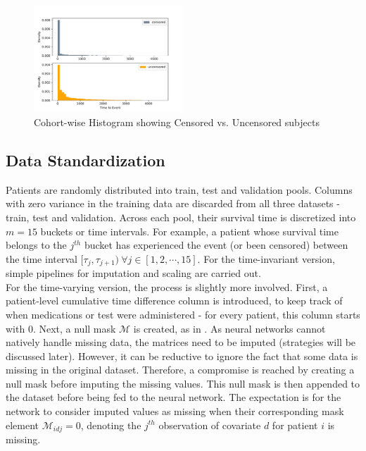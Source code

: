 \documentclass[%
 twocolumn,
 reprint,
 amsmath,amssymb,
 aps,nofootinbib
]{revtex4-2}
\begin{document}
\begin{figure}[H]
  \centering
  \includegraphics[width=0.5\textwidth]{cohort_hist.pdf}
  \caption[Cohort-wise Histogram]{Cohort-wise Histogram showing Censored vs. Uncensored subjects}
  \label{fig:cohort_hist}
\end{figure}

\subsection{\label{censoring}Data Standardization}
Patients are randomly distributed into train, test and validation pools. Columns with zero variance in the training data are discarded from all three datasets - train, test and validation. Across each pool, their survival time is discretized into $m=15$ buckets or time intervals. For example, a patient whose survival time belongs to the $j^{th}$ bucket has experienced the event (or been censored) between the time interval $[\tau_j, \tau_{j+1})\ \forall j \in [1,2,\cdots,15]$. For the time-invariant version, simple pipelines for imputation and scaling are carried out. \\

For the time-varying version, the process is slightly more involved. First, a patient-level cumulative time difference column is introduced, to keep track of when medications or test were administered - for every patient, this column starts with 0. Next, a null mask $\mathcal{M}$ is created, as in \cite{deephit}. As neural networks cannot natively handle missing data, the matrices need to be imputed (strategies will be discussed later). However, it can be reductive to ignore the fact that some data is missing in the original dataset. Therefore, a compromise is reached by creating a null mask before imputing the missing values. This null mask is then appended to the dataset before being fed to the neural network. The expectation is for the network to consider imputed values as missing when their corresponding mask element $\mathcal{M}_{idj}=0$, denoting the $j^{th}$ observation of covariate $d$ for patient $i$ is missing.\\
\end{document}
